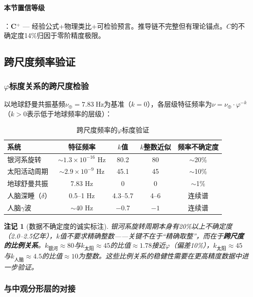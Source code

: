 \documentclass[12pt,a4paper,twocolumn]{article}
\renewcommand{\phi}{\varphi}
\newtheorem{remark}[theorem]{注记}
\begin{document}
\paragraph{本节置信等级}：\textbf{C$^+$} --- 经验公式+物理类比+可检验预言。推导链不完整但有理论锚点。$C$的不确定度14\%归因于零阶精度极限。

\subsection{跨尺度频率验证}
\label{subsec:cross_scale}

\subsubsection{$\phi$标度关系的跨尺度检验}

以地球舒曼共振基频$\nu_{\oplus} = 7.83\;\text{Hz}$为基准（$k=0$），各层级特征频率为$\nu = \nu_{\oplus} \cdot \phi^{-k}$（$k>0$表示低于地球频率的层级）：

\begin{table}[htbp]
\centering
\caption{跨尺度频率的$\phi$标度验证}
\label{tab:cross_scale}
\begin{tabular}{lcccc}
\hline
系统 & 特征频率 & $k$值 & $k$整数近似 & 频率不确定度 \\
\hline
银河系旋转 & $\sim 1.3\times10^{-16}$ Hz & 80.2 & 80 & $\sim$20\% \\
太阳活动周期 & $\sim 2.9\times10^{-9}$ Hz & 45.1 & 45 & $\sim$10\% \\
地球舒曼共振 & 7.83 Hz & 0 & 0 & $\sim$1\% \\
人脑深睡（$\delta$） & 0.5--1 Hz & 4.3--5.7 & 4--6 & 连续谱 \\
人脑$\gamma$波 & $\sim$40 Hz & $-0.7$ & $-1$ & 连续谱 \\
\hline
\end{tabular}
\end{table}

\begin{remark}[数据不确定度的诚实标注]
\label{rmk:cross_scale_caveat}
银河系旋转周期本身有20\%以上不确定度（2.0--2.5亿年），$k$值不要求精确整数——关键不在于``精确取整''，而在于\textbf{跨尺度的比例关系}。$k_{\text{银河}}\approx 80$与$k_{\text{太阳}}\approx 45$的比值$\approx 1.78$接近$\phi$（偏差10\%），$k_{\text{太阳}}\approx 45$与$k_{\text{人脑}}\approx 4.5$的比值$\approx 10$为整数。这些比例关系的稳健性需要在更高精度数据中进一步验证。
\end{remark}

\subsubsection{与中观分形层的对接}
\end{document}
